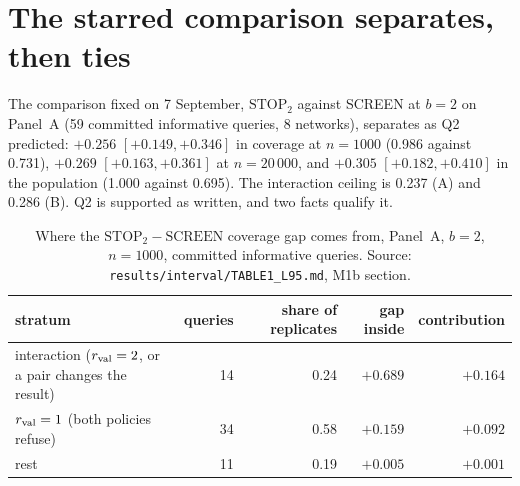 
\begin{antes}
\end{antes}

\section{The starred comparison separates, then ties}

The comparison fixed on 7 September, $\mathrm{STOP}_2$ against SCREEN at $b = 2$ on Panel~A (59
committed informative queries, 8 networks), separates as Q2 predicted: $+0.256$ $[+0.149, +0.346]$ in
coverage at $n = 1000$ (0.986 against 0.731), $+0.269$ $[+0.163, +0.361]$ at $n = 20\,000$, and
$+0.305$ $[+0.182, +0.410]$ in the population (1.000 against 0.695). The interaction ceiling is 0.237
(A) and 0.286 (B). Q2 is supported as written, and two facts qualify it.

\begin{table}[!ht]
\centering\footnotesize
\caption{Where the $\mathrm{STOP}_2 - \mathrm{SCREEN}$ coverage gap comes from, Panel~A, $b = 2$,
$n = 1000$, committed informative queries. Source: \texttt{results/interval/TABLE1\_L95.md}, M1b
section.}
\label{tab:m1b-decomp}
\begin{tabular}{@{}lrrrr@{}}
\toprule
stratum & queries & share of replicates & gap inside & contribution \\
\midrule
interaction ($r_{\mathrm{val}} = 2$, or a pair changes the result) & 14 & 0.24 & $+0.689$ & $+0.164$ \\
$r_{\mathrm{val}} = 1$ (both policies refuse)                       & 34 & 0.58 & $+0.159$ & $+0.092$ \\
rest                                                     & 11 & 0.19 & $+0.005$ & $+0.001$ \\
\bottomrule
\end{tabular}
\end{table}

